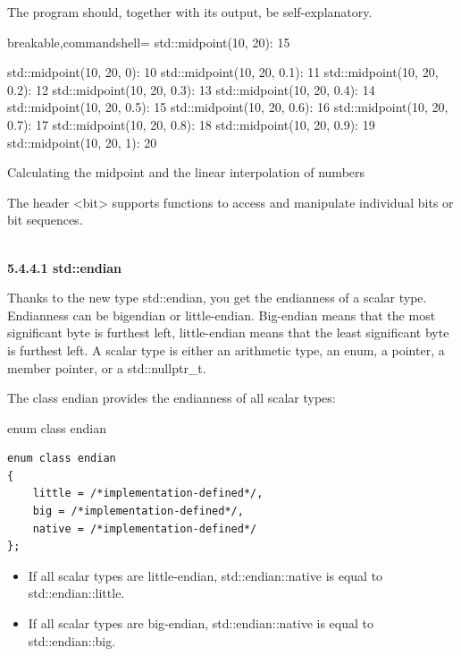The program should, together with its output, be self-explanatory.

\begin{tcblisting}{breakable,commandshell={}}
std::midpoint(10, 20): 15

std::midpoint(10, 20, 0): 10
std::midpoint(10, 20, 0.1): 11
std::midpoint(10, 20, 0.2): 12
std::midpoint(10, 20, 0.3): 13
std::midpoint(10, 20, 0.4): 14
std::midpoint(10, 20, 0.5): 15
std::midpoint(10, 20, 0.6): 16
std::midpoint(10, 20, 0.7): 17
std::midpoint(10, 20, 0.8): 18
std::midpoint(10, 20, 0.9): 19
std::midpoint(10, 20, 1): 20
\end{tcblisting}

\begin{center}
Calculating the midpoint and the linear interpolation of numbers
\end{center}


The header <bit> supports functions to access and manipulate individual bits or bit sequences.

\hspace*{\fill} \\ %
\noindent
\textbf{5.4.4.1\hspace{0.2cm} std::endian}

Thanks to the new type std::endian, you get the endianness of a scalar type. Endianness can be bigendian or little-endian. Big-endian means that the most significant byte is furthest left, little-endian means that the least significant byte is furthest left. A scalar type is either an arithmetic type, an enum, a pointer, a member pointer, or a std::nullptr\_t.

The class endian provides the endianness of all scalar types:

\noindent
enum class endian
\begin{lstlisting}[style=styleCXX]
enum class endian
{
	little = /*implementation-defined*/,
	big = /*implementation-defined*/,
	native = /*implementation-defined*/
};
\end{lstlisting}

\begin{itemize}
\item 
If all scalar types are little-endian, std::endian::native is equal to std::endian::little.

\item 
If all scalar types are big-endian, std::endian::native is equal to std::endian::big.
\end{itemize}

